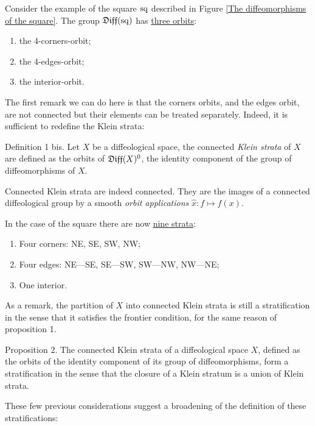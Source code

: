 Consider the example of the square ${\operatorname{sq}}$ described in Figure \ref{The diffeomorphisms of the square}.
The group $\mathfrak{Diff}({\operatorname{sq}})$ has \uline{three orbits}:

\begin{enumerate}
  \item[1.] the 4-corners-orbit;
  \item[2.] the 4-edges-orbit;
  \item[3.] the interior-orbit.
\end{enumerate}

The first remark we can do here is that the corners orbits,
and the edges orbit,
are not connected but their elements can be treated separately.
Indeed,
it is sufficient to redefine the Klein strata:

\begin{Article}{Definition 1 bis.}{}
  Let $X$ be a diffeological space,
  the connected \emph{Klein strata} of $X$ are defined as the orbits of $\mathfrak{Diff}(X)^0$,
  the identity component of the group of diffeomorphisms of $X$.
\end{Article}

Connected Klein strata are indeed connected.
They are the images of a connected diffeological group by a smooth \emph{orbit applications} $\hat x : f \mapsto f(x)$.

In the case of the square there are now \uline{nine strata}:

\begin{enumerate}
  \item[1.] Four corners: NE, SE, SW, NW;
  \item[2.] Four edges: NE---SE, SE---SW, SW---NW, NW---NE;
  \item[3.] One interior.
\end{enumerate}

As a remark,
the partition of $X$ into connected Klein strata is still a stratification in the sense that it satisfies the frontier condition,
for the same reason of proposition 1.

\begin{Article}{Proposition 2.}{}
  The connected Klein strata of a diffeological space $X$,
  defined as the orbits of the identity component of its group of diffeomorphisms,
  form a stratification in the sense that the closure of a Klein stratum is a union of Klein strata.
\end{Article}

These few previous considerations suggest a broadening of the definition of these stratifications:

